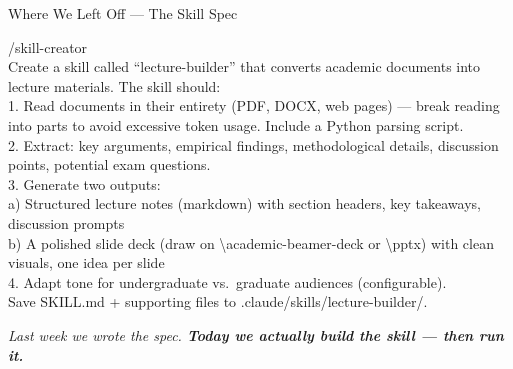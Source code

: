 \documentclass[aspectratio=169, 10pt]{beamer}
\begin{document}
{
\begin{frame}
\end{frame}
}

\begin{frame}[fragile]{Where We Left Off --- The Skill Spec}
\begin{tcolorbox}[promptboxsm]
{\color{CoolGray}\fontsize{6}{7.5}\selectfont\ttfamily /skill-creator\\[2pt]
\color{white}\fontsize{6}{7.5}\selectfont\ttfamily
Create a skill called ``lecture-builder'' that converts academic documents into lecture materials. The skill should:\\[1pt]
1. Read documents in their entirety (PDF, DOCX, web pages) --- break reading into parts to avoid excessive token usage. Include a Python parsing script.\\[1pt]
2. Extract: key arguments, empirical findings, methodological details, discussion points, potential exam questions.\\[1pt]
3. Generate two outputs:\\
\quad a) Structured lecture notes (markdown) with section headers, key takeaways, discussion prompts\\
\quad b) A polished slide deck (draw on \textbackslash academic-beamer-deck or \textbackslash pptx) with clean visuals, one idea per slide\\[1pt]
4. Adapt tone for undergraduate vs.\ graduate audiences (configurable).\\[1pt]
Save SKILL.md + supporting files to .claude/skills/lecture-builder/.
}
\end{tcolorbox}
\vskip3pt
\begin{center}
{\scriptsize\color{CoolGray}\textit{Last week we wrote the spec. \textbf{\color{DeepCharcoal}Today we actually build the skill --- then run it.}}}
\end{center}
\end{frame}
\end{document}
